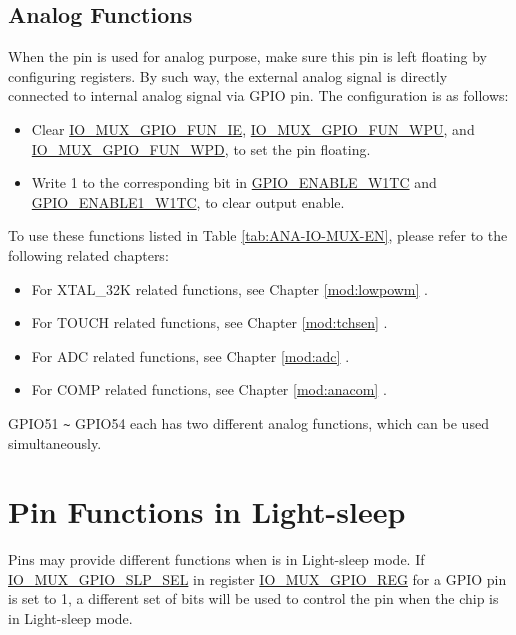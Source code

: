 \documentclass[main\_\_EN.tex]{subfiles}
\begin{document}
\subsection{Analog Functions}
When the pin is used for analog purpose, make sure this pin is left floating by configuring registers. By such way, the external analog signal is directly connected to internal analog signal via GPIO pin. The configuration is as follows:

\begin{itemize}
    \item Clear  \hyperref[fielddesc:IOMUXGPIONFUNIE]{IO\_MUX\_GPIO\_FUN\_IE}, \hyperref[fielddesc:IOMUXGPIONFUNWPU]{IO\_MUX\_GPIO\_FUN\_WPU}, and \hyperref[fielddesc:IOMUXGPIONFUNWPD]{IO\_MUX\_GPIO\_FUN\_WPD}, to set the pin floating.
    \item Write 1 to the corresponding bit in  \hyperref[regdesc:GPIOENABLEW1TCREG]{GPIO\_ENABLE\_W1TC} and \hyperref[regdesc:GPIOENABLE1W1TCREG]{GPIO\_ENABLE1\_W1TC}, to clear output enable.
\end{itemize}

To use these functions listed in Table \ref{tab:ANA-IO-MUX-EN}, please refer to the following related chapters:
\begin{itemize}
    \item For XTAL\_32K related functions, see Chapter \ref{mod:lowpowm} \textit{}.
    \item For TOUCH related functions, see Chapter \ref{mod:tchsen} \textit{}.
    \item For ADC related functions, see Chapter \ref{mod:adc} \textit{}.
    \item For COMP related functions, see Chapter \ref{mod:anacom} \textit{}.
\end{itemize}

\begin{tiplisting}
GPIO51 \verb+~+ GPIO54 each has two different analog functions, which can be used simultaneously.
\end{tiplisting}

\section{Pin Functions in Light-sleep}\label{sec:iomuxgpio-pin-func-light-sleep}

Pins may provide different functions when  \chipname{} is in Light-sleep mode. If  \hyperref[fielddesc:IOMUXGPIONSLPSEL]{IO\_MUX\_GPIO\_SLP\_SEL} in register \hyperref[regdesc:IOMUXGPIONREG]{IO\_MUX\_GPIO\_REG} for a GPIO pin is set to 1, a different set of bits will be used to control the pin when the chip is in Light-sleep mode.
\end{document}

